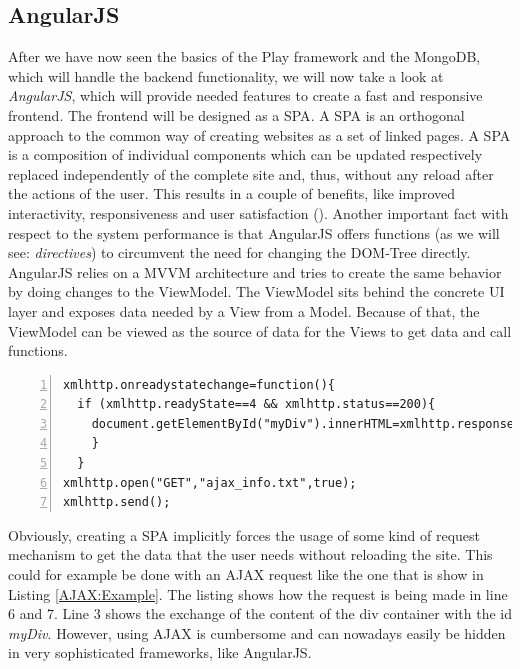 \subsection{AngularJS}
\label{AngularJS}
After we have now seen the basics of the Play framework and the MongoDB, which will handle the backend functionality, we will now take a look at \textit{AngularJS}, which will provide needed features to create a fast and responsive frontend. The frontend will be designed as a \ac{SPA}. A \ac{SPA} is an orthogonal approach to the common way of creating websites as a set of linked pages. A \ac{SPA} is a composition of individual components which can be updated respectively replaced independently of the complete site and, thus, without any reload after the actions of the user. This results in a couple of benefits, like improved interactivity, responsiveness and user satisfaction (\cite{Mes07}). Another important fact with respect to the system performance is that AngularJS offers functions (as we will see: \emph{directives}) to circumvent the need for changing the \ac{DOM}-Tree directly. AngularJS relies on a \ac{MVVM} architecture and tries to create the same behavior by doing changes to the ViewModel. The ViewModel sits behind the concrete \ac{UI} layer and exposes data needed by a View from a Model. Because of that, the ViewModel can be viewed as the source of data for the Views to get data and call functions. 

\begin{lstlisting}[numbers=left,caption={Simple example that shows the use of an AJAX request that shows the response text within a specific div container},label=AJAX:Example,frame=tlbr,breaklines]
xmlhttp.onreadystatechange=function(){
  if (xmlhttp.readyState==4 && xmlhttp.status==200){
    document.getElementById("myDiv").innerHTML=xmlhttp.responseText;
    }
  }
xmlhttp.open("GET","ajax_info.txt",true);
xmlhttp.send();
\end{lstlisting}

Obviously, creating a \ac{SPA} implicitly forces the usage of some kind of request mechanism to get the data that the user needs without reloading the site. This could for example be done with an \ac{AJAX} request like the one that is show in Listing \ref{AJAX:Example}. The listing shows how the request is being made in line 6 and 7. Line 3 shows the exchange of the content of the div container with the id \textit{myDiv}. However, using \ac{AJAX} is cumbersome and can nowadays easily be hidden in very sophisticated frameworks, like AngularJS.

